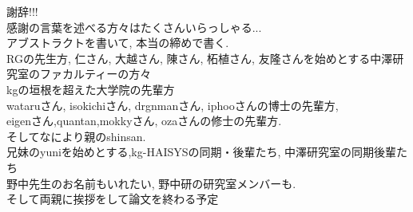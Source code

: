 \begin{acknowledgment}
謝辞!!!\\
感謝の言葉を述べる方々はたくさんいらっしゃる...\\
アブストラクトを書いて, 本当の締めで書く.\\
RGの先生方, 仁さん, 大越さん, 陳さん, 柘植さん, 友隆さんを始めとする中澤研究室のファカルティーの方々\\
kgの垣根を超えた大学院の先輩方\\
wataruさん, isokichiさん, drgnmanさん, iphooさんの博士の先輩方,\\
eigenさん,quantan,mokkyさん, ozaさんの修士の先輩方.\\
そしてなにより親のshinsan.\\
兄妹のyuniを始めとする,kg-HAISYSの同期・後輩たち, 中澤研究室の同期後輩たち\\
野中先生のお名前もいれたい, 野中研の研究室メンバーも.\\
そして両親に挨拶をして論文を終わる予定\\

\end{acknowledgment}
